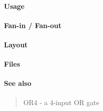 \paragraph{Usage}

\paragraph{Fan-in / Fan-out}

\paragraph{Layout}

\paragraph{Files}

\paragraph{See also}
\begin{quote}
    OR4 - a 4-input OR gate
\end{quote}
